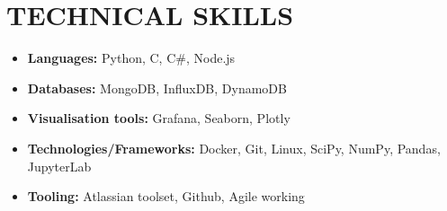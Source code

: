 \documentclass[letterpaper,11pt]{article}
\newcommand{\resumeItem}[1]{
  \item\small{
    {#1 \vspace{-2pt}}
  }
}
\newcommand{\resumeSubHeadingListStart}{\begin{itemize}[leftmargin=0.0in, label={}]}
\newcommand{\resumeSubHeadingListEnd}{\end{itemize}}
\newcommand{\resumeItemListStart}{\begin{itemize}}
\newcommand{\resumeItemListEnd}{\end{itemize}\vspace{-5pt}}
\begin{document}
\section{TECHNICAL SKILLS}
    \resumeSubHeadingListStart

          \resumeItemListStart

    \resumeItem{\textbf{Languages:}{ Python, C, C\#, Node.js}}
     \resumeItem{\textbf{Databases:}{ MongoDB, InfluxDB, DynamoDB}}
     \resumeItem{\textbf{Visualisation tools:}{ Grafana, Seaborn, Plotly}}
     \resumeItem{\textbf{Technologies/Frameworks:}{ Docker, Git, Linux, SciPy, NumPy, Pandas, JupyterLab }}
    \resumeItem{ \textbf{Tooling:}{ Atlassian toolset, Github, Agile working}}
    
      \resumeItemListEnd
          \resumeSubHeadingListEnd

 \vspace{-15pt}

\end{document}
